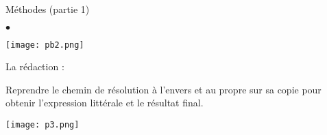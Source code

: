 \documentclass[10pt]{article}
\newcommand{\titre}{Méthodes (partie 1)} %
\begin{document}
\begin{titlebox}{\titre}
\begin{list}{$\bullet$}{}
              \begin{center}
                  \texttt{[image: pb2.png]}
              \end{center}
        \item La rédaction :

              Reprendre le chemin de résolution à l'envers et au propre sur sa copie pour obtenir l'expression littérale et le résultat final.

              \vspace{5pt}
              \begin{center}
                  \texttt{[image: p3.png]}
              \end{center}
              \vspace{-0pt}
    \end{list}




\end{titlebox}
\end{document}
